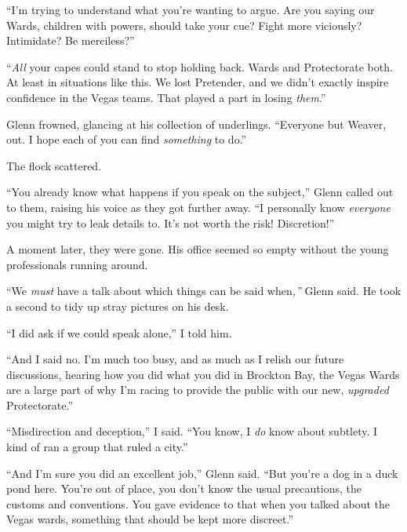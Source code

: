 ``I'm trying to understand what you're wanting to argue.  Are you saying our Wards, children with powers, should take your cue?  Fight more viciously?  Intimidate?  Be merciless?''



``\emph{All} your capes could stand to stop holding back.  Wards and Protectorate both.  At least in situations like this.  We lost Pretender, and we didn't exactly inspire confidence in the Vegas teams.  That played a part in losing \emph{them}.''



Glenn frowned, glancing at his collection of underlings.  ``Everyone but Weaver, out.  I hope each of you can find \emph{something} to do.''



The flock scattered.



``You already know what happens if you speak on the subject,'' Glenn called out to them, raising his voice as they got further away.  ``I personally know \emph{everyone }you might try to leak details to.  It's not worth the risk!  Discretion!''



A moment later, they were gone.  His office seemed so empty without the young professionals running around.



``We \emph{must} have a talk about which things can be said when\emph{,'' }Glenn said.  He took a second to tidy up stray pictures on his desk.



``I did ask if we could speak alone,'' I told him.



``And I said no.  I'm much too busy, and as much as I relish our future discussions, hearing how you did what you did in Brockton Bay, the Vegas Wards are a large part of why I'm racing to provide the public with our new, \emph{upgraded} Protectorate.''



``Misdirection and deception,'' I said.  ``You know, I \emph{do} know about subtlety.  I kind of ran a group that ruled a city.''



``And I'm sure you did an excellent job,'' Glenn said.  ``But you're a dog in a duck pond here.  You're out of place, you don't know the usual precautions, the customs and conventions.  You gave evidence to that when you talked about the Vegas wards, something that should be kept more discreet.''




